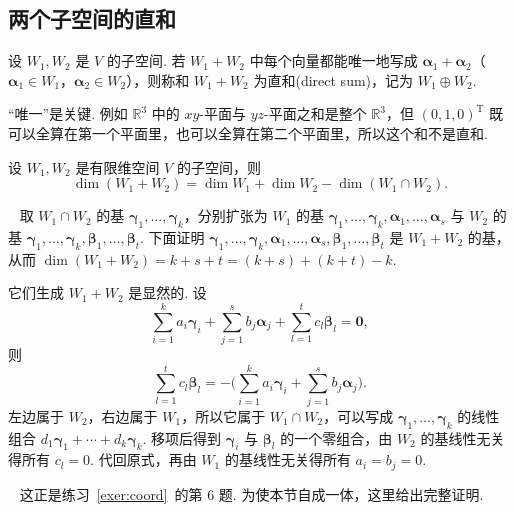 \documentclass[lang=cn,10.5pt,scheme=chinese,toc=twocol,section,chinesefont=nofont,
twoside,citestyle=gb7714-2015,bibstyle=gb7714-2015]{elegantbook}
\DeclareRobustCommand{\textbf}[1]{{\lnsemiboldlatin\lnsemiboldcjk #1}}
\newcommand{\vv}[1]{\boldsymbol{#1}}
\newcommand{\zero}{\boldsymbol{0}}          %
\newcommand{\trans}{\mathrm{T}}             %
\numberwithin{equation}{section}   %
\newcommand*{\lnlabel}[1]{{\sffamily\bfseries\color{black}#1}}
\renewenvironment{proof}{%
	\par\noindent\lnlabel{\proofname}\;\ \color{black!90}\cfs}{\par}
\renewenvironment{remark}{\noindent\lnlabel{\remarkname}\ }{\par}
\begin{document}
\subsection{两个子空间的直和}

\begin{definition}
  设 $W_1,W_2$ 是 $V$ 的子空间. 若 $W_1+W_2$ 中每个向量都能\textbf{唯一地}写成 $\vv\alpha_1+\vv\alpha_2$（$\vv\alpha_1\in W_1$，$\vv\alpha_2\in W_2$），则称和 $W_1+W_2$ 为\textbf{直和}(direct sum)，记为 $W_1\oplus W_2$.
\end{definition}

“唯一”是关键. 例如 $\mathbb{R}^3$ 中的 $xy$-平面与 $yz$-平面之和是整个 $\mathbb{R}^3$，但 $(0,1,0)^\trans$ 既可以全算在第一个平面里，也可以全算在第二个平面里，所以这个和不是直和.

\begin{theorem}[维数公式]\label{thm:dimformula}
  设 $W_1,W_2$ 是有限维空间 $V$ 的子空间，则
  \[\dim(W_1+W_2)=\dim W_1+\dim W_2-\dim(W_1\cap W_2).\]
\end{theorem}
\begin{proof}
  取 $W_1\cap W_2$ 的基 $\vv\gamma_1,\ldots,\vv\gamma_k$，分别扩张为 $W_1$ 的基 $\vv\gamma_1,\ldots,\vv\gamma_k,\vv\alpha_1,\ldots,\vv\alpha_s$ 与 $W_2$ 的基 $\vv\gamma_1,\ldots,\vv\gamma_k,\vv\beta_1,\ldots,\vv\beta_t$. 下面证明 $\vv\gamma_1,\ldots,\vv\gamma_k,\vv\alpha_1,\ldots,\vv\alpha_s,\vv\beta_1,\ldots,\vv\beta_t$ 是 $W_1+W_2$ 的基，从而 $\dim(W_1+W_2)=k+s+t=(k+s)+(k+t)-k$.

  它们生成 $W_1+W_2$ 是显然的. 设
  \[\sum_{i=1}^k a_i\vv\gamma_i+\sum_{j=1}^s b_j\vv\alpha_j+\sum_{l=1}^t c_l\vv\beta_l=\zero,\]
  则
  \[\sum_{l=1}^t c_l\vv\beta_l=-\Big(\sum_{i=1}^k a_i\vv\gamma_i+\sum_{j=1}^s b_j\vv\alpha_j\Big).\]
  左边属于 $W_2$，右边属于 $W_1$，所以它属于 $W_1\cap W_2$，可以写成 $\vv\gamma_1,\ldots,\vv\gamma_k$ 的线性组合 $d_1\vv\gamma_1+\cdots+d_k\vv\gamma_k$. 移项后得到 $\vv\gamma_i$ 与 $\vv\beta_l$ 的一个零组合，由 $W_2$ 的基线性无关得所有 $c_l=0$. 代回原式，再由 $W_1$ 的基线性无关得所有 $a_i=b_j=0$.
\end{proof}

\begin{remark}
  这正是练习~\ref{exer:coord}~的第 6 题. 为使本节自成一体，这里给出完整证明.
\end{remark}
\end{document}
